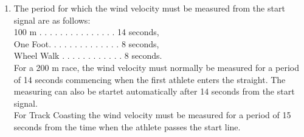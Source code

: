 \begin{enumerate}[leftmargin=1.5em,labelsep=*]
	\item The period for which the wind velocity must be measured from the start signal are as follows:\\		
			100 m . . . . . . . . . . . . . . .  14 seconds,\\
			One Foot. . . . . . . . . . . . . .  8 seconds,\\
			Wheel Walk . . . . . . . . . . . . 8 seconds.\\
			For a 200 m race, the wind velocity must normally be measured for a period of 14 seconds commencing 
      when the first athlete enters the straight. The measuring can also be startet automatically after 
      14 seconds from the start signal.\\
			For Track Coasting the wind velocity must be measured for a period of 15 seconds from the time when 
      the athlete passes the start line.\\
\end{enumerate}